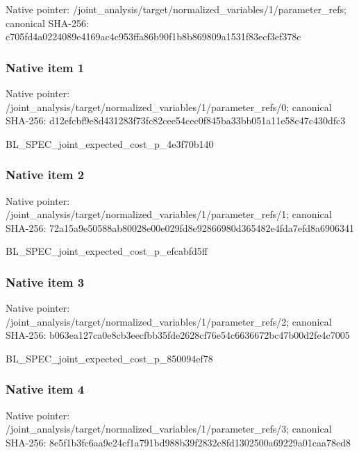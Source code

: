 \documentclass[10pt,a4paper]{article}
\begin{document}
Native pointer: /joint\_analysis/target/n\allowbreak{}ormalized\_variables/1/pa\allowbreak{}rameter\_refs; canonical SHA-256: c705fd4a0224089e4169ac4c\allowbreak{}953ffa86b90f1b8b869809a1\allowbreak{}531f83ecf3ef378c



\subsubsection{Native item 1}


Native pointer: /joint\_analysis/target/n\allowbreak{}ormalized\_variables/1/pa\allowbreak{}rameter\_refs/0; canonical SHA-256: d12efcbf9e8d431283f73fc8\allowbreak{}2cee54cec0f845ba33bb051a\allowbreak{}11e58c47c430dfc3


BL\_SPEC\_joint\_expected\_c\allowbreak{}ost\_p\_4e3f70b140


\subsubsection{Native item 2}


Native pointer: /joint\_analysis/target/n\allowbreak{}ormalized\_variables/1/pa\allowbreak{}rameter\_refs/1; canonical SHA-256: 72a15a9e50588ab80028e00e\allowbreak{}029fd8e92866980d365482e4\allowbreak{}fda7efd8a6906341


BL\_SPEC\_joint\_expected\_c\allowbreak{}ost\_p\_efcabfd5ff


\subsubsection{Native item 3}


Native pointer: /joint\_analysis/target/n\allowbreak{}ormalized\_variables/1/pa\allowbreak{}rameter\_refs/2; canonical SHA-256: b063ea127ca0e8cb3eecfbb3\allowbreak{}5fde2628cf76e54c6636672b\allowbreak{}c47b00d2fe4c7005


BL\_SPEC\_joint\_expected\_c\allowbreak{}ost\_p\_850094ef78


\subsubsection{Native item 4}


Native pointer: /joint\_analysis/target/n\allowbreak{}ormalized\_variables/1/pa\allowbreak{}rameter\_refs/3; canonical SHA-256: 8e5f1b3fc6aa9e24cf1a791b\allowbreak{}d988b39f2832c8fd1302500a\allowbreak{}69229a01caa78ed8
\end{document}
